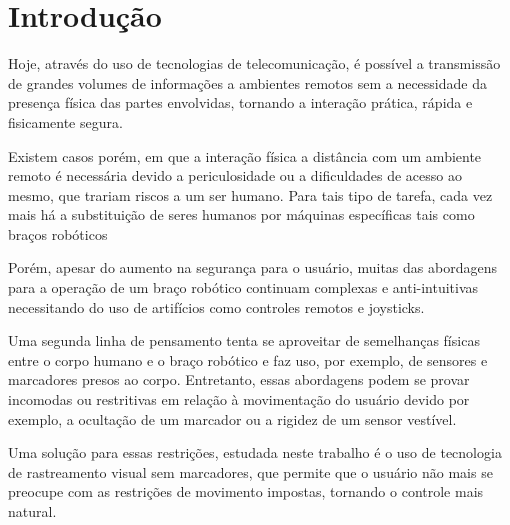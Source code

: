 
	\chapter{Introdução} 
	Hoje, através do uso de tecnologias de telecomunicação, é possível a transmissão de grandes volumes de informações a ambientes remotos sem a necessidade da presença física das partes envolvidas, tornando a interação prática, rápida e fisicamente segura.\par
	
	 Existem casos porém\cite{uses-arm}\cite{uses-robot}, em que a interação física a distância com um ambiente remoto é necessária devido a periculosidade ou a dificuldades de acesso ao mesmo, que trariam riscos a um ser humano. Para tais tipo de tarefa, cada vez mais há a substituição de seres humanos por máquinas específicas tais como braços robóticos \par
	
	
	 Porém, apesar do aumento na segurança para o usuário, muitas das abordagens para a operação de um braço robótico continuam complexas e anti-intuitivas  necessitando do uso de artifícios como controles remotos\cite{datasheet-caliber} e joysticks\cite{joystick}. \par
	 
	 Uma segunda linha de pensamento tenta se aproveitar de semelhanças físicas entre o corpo humano e o braço robótico e faz uso, por exemplo, de sensores \cite{wearable} e marcadores\cite{tracker-based} presos ao corpo. Entretanto, essas abordagens podem se provar incomodas ou restritivas em relação à movimentação do usuário devido por exemplo, a ocultação de um marcador ou a rigidez de um sensor vestível.\cite{kinect-based}\par 
	 
	 Uma solução para essas restrições, estudada neste trabalho é o uso de tecnologia de rastreamento visual sem marcadores, que permite que o usuário não mais se preocupe com as restrições de movimento impostas, tornando o controle mais natural.\cite{kinect-based} \par 
	
